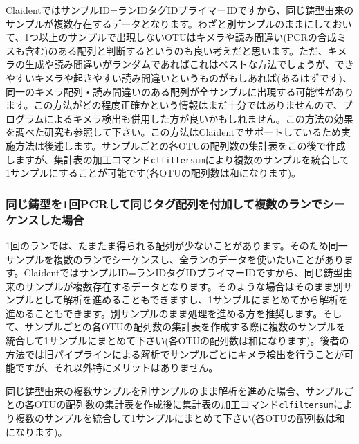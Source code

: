 \documentclass[titlepage,10pt,a4paper]{jsbook}
\begin{document}
ClaidentではサンプルID=ランID{\textunderscore}{\textunderscore}タグID{\textunderscore}{\textunderscore}プライマーIDですから、同じ鋳型由来のサンプルが複数存在するデータとなります。わざと別サンプルのままにしておいて、1つ以上のサンプルで出現しないOTUはキメラや読み間違い(PCRの合成ミスも含む)のある配列と判断するというのも良い考えだと思います。ただ、キメラの生成や読み間違いがランダムであればこれはベストな方法でしょうが、できやすいキメラや起きやすい読み間違いというものがもしあれば(あるはずです)、同一のキメラ配列・読み間違いのある配列が全サンプルに出現する可能性があります。この方法がどの程度正確かという情報はまだ十分ではありませんので、プログラムによるキメラ検出も併用した方が良いかもしれません。この方法の効果を調べた研究\citep{Lange2015}も参照して下さい。この方法はClaidentでサポートしているため実施方法は後述します。サンプルごとの各OTUの配列数の集計表をこの後で作成しますが、集計表の加工コマンド\texttt{clfiltersum}により複数のサンプルを統合して1サンプルにすることが可能です(各OTUの配列数は和になります)。

\subsubsection{同じ鋳型を1回PCRして同じタグ配列を付加して複数のランでシーケンスした場合}

1回のランでは、たまたま得られる配列が少ないことがあります。そのため同一サンプルを複数のランでシーケンスし、全ランのデータを使いたいことがあります。ClaidentではサンプルID=ランID{\textunderscore}{\textunderscore}タグID{\textunderscore}{\textunderscore}プライマーIDですから、同じ鋳型由来のサンプルが複数存在するデータとなります。そのような場合はそのまま別サンプルとして解析を進めることもできますし、1サンプルにまとめてから解析を進めることもできます。別サンプルのまま処理を進める方を推奨します。そして、サンプルごとの各OTUの配列数の集計表を作成する際に複数のサンプルを統合して1サンプルにまとめて下さい(各OTUの配列数は和になります)。後者の方法では旧パイプラインによる解析でサンプルごとにキメラ検出を行うことが可能ですが、それ以外特にメリットはありません。

同じ鋳型由来の複数サンプルを別サンプルのまま解析を進めた場合、サンプルごとの各OTUの配列数の集計表を作成後に集計表の加工コマンド\texttt{clfiltersum}により複数のサンプルを統合して1サンプルにまとめて下さい(各OTUの配列数は和になります)。
\end{document}
